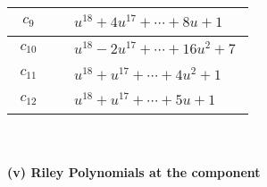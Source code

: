 \documentclass[1p]{elsarticle_modified}
\theoremstyle{definition}
\begin{document}
\begin{tabular}{m{50pt}|m{274pt}}
\hline $$\begin{aligned}c_{9}\end{aligned}$$&$\begin{aligned}
&u^{18}+4 u^{17}+\cdots+8 u+1
\end{aligned}$\\
\hline $$\begin{aligned}c_{10}\end{aligned}$$&$\begin{aligned}
&u^{18}-2 u^{17}+\cdots+16 u^2+7
\end{aligned}$\\
\hline $$\begin{aligned}c_{11}\end{aligned}$$&$\begin{aligned}
&u^{18}+u^{17}+\cdots+4 u^2+1
\end{aligned}$\\
\hline $$\begin{aligned}c_{12}\end{aligned}$$&$\begin{aligned}
&u^{18}+u^{17}+\cdots+5 u+1
\end{aligned}$\\
\hline
\end{tabular}\\~\\
\newpage\renewcommand{\arraystretch}{1}
\flushleft \textbf{(v) Riley Polynomials at the component}\newline \\
\end{document}
